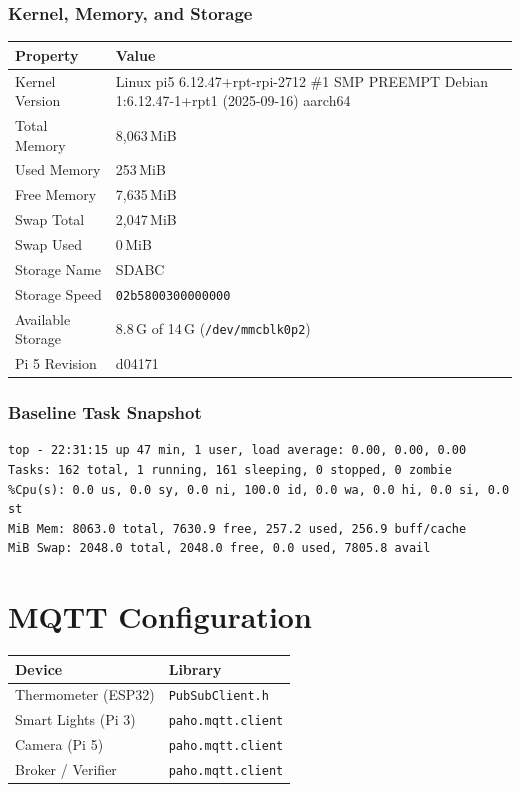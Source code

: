\documentclass[11pt,letterpaper]{article}
\newcommand{\code}[1]{\texttt{#1}}
\begin{document}
\subsubsection{Kernel, Memory, and Storage}

\begin{tabular}{@{}L{5cm}L{9cm}@{}}
\toprule
\textbf{Property} & \textbf{Value} \\
\midrule
Kernel Version   & Linux pi5 6.12.47+rpt-rpi-2712 \#1 SMP PREEMPT Debian 1:6.12.47-1+rpt1 (2025-09-16) aarch64 \\
Total Memory     & 8,063\,MiB \\
Used Memory      & 253\,MiB \\
Free Memory      & 7,635\,MiB \\
Swap Total       & 2,047\,MiB \\
Swap Used        & 0\,MiB \\
Storage Name     & SDABC \\
Storage Speed    & \code{02b5800300000000} \\
Available Storage & 8.8\,G of 14\,G (\code{/dev/mmcblk0p2}) \\
Pi 5 Revision    & d04171 \\
\bottomrule
\end{tabular}

\subsubsection{Baseline Task Snapshot}

\begin{verbatim}
top - 22:31:15 up 47 min, 1 user, load average: 0.00, 0.00, 0.00
Tasks: 162 total, 1 running, 161 sleeping, 0 stopped, 0 zombie
%Cpu(s): 0.0 us, 0.0 sy, 0.0 ni, 100.0 id, 0.0 wa, 0.0 hi, 0.0 si, 0.0 st
MiB Mem: 8063.0 total, 7630.9 free, 257.2 used, 256.9 buff/cache
MiB Swap: 2048.0 total, 2048.0 free, 0.0 used, 7805.8 avail
\end{verbatim}

\section{MQTT Configuration}

\begin{tabular}{@{}L{5cm}L{9cm}@{}}
\toprule
\textbf{Device} & \textbf{Library} \\
\midrule
Thermometer (ESP32) & \code{PubSubClient.h} \\
Smart Lights (Pi 3) & \code{paho.mqtt.client} \\
Camera (Pi 5)       & \code{paho.mqtt.client} \\
Broker / Verifier   & \code{paho.mqtt.client} \\
\bottomrule
\end{tabular}
\end{document}
